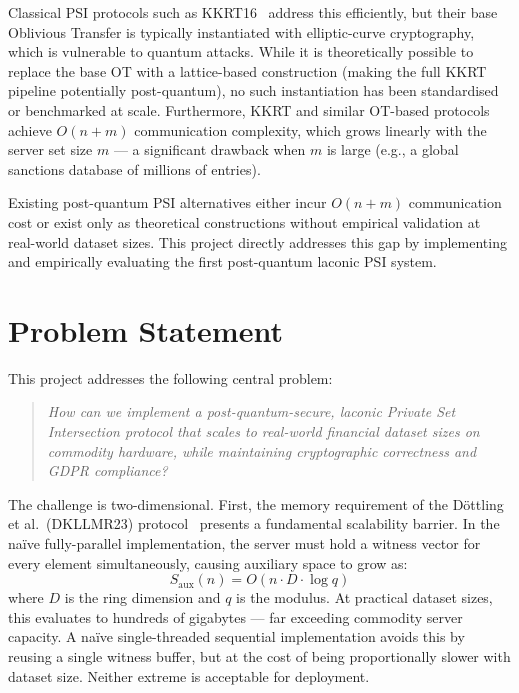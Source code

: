 Classical PSI protocols such as KKRT16~\cite{kolesnikov2016efficient} address this
efficiently, but their base Oblivious Transfer is typically instantiated with
elliptic-curve cryptography, which is vulnerable to quantum attacks. While it is
theoretically possible to replace the base OT with a lattice-based construction
(making the full KKRT pipeline potentially post-quantum), no such instantiation has
been standardised or benchmarked at scale. Furthermore, KKRT and similar OT-based
protocols achieve $O(n + m)$ communication complexity, which grows linearly with the
server set size $m$ --- a significant drawback when $m$ is large (e.g., a global
sanctions database of millions of entries).

Existing post-quantum PSI alternatives either incur $O(n + m)$ communication cost
or exist only as theoretical constructions without empirical validation at
real-world dataset sizes. This project directly addresses this gap by implementing
and empirically evaluating the first post-quantum laconic PSI system.

\section{Problem Statement}

This project addresses the following central problem:
\begin{quote}
    \textit{How can we implement a post-quantum-secure, laconic Private Set Intersection
    protocol that scales to real-world financial dataset sizes on commodity hardware,
    while maintaining cryptographic correctness and GDPR compliance?}
\end{quote}

The challenge is two-dimensional. First, the memory requirement of the D\"{o}ttling
et al.\ (DKLLMR23) protocol~\cite{dottling2023efficient} presents a fundamental
scalability barrier. In the na\"{i}ve fully-parallel implementation, the server must
hold a witness vector for every element simultaneously, causing auxiliary space to
grow as:
\[
    S_{\text{aux}}(n) = O(n \cdot D \cdot \log q)
\]
where $D$ is the ring dimension and $q$ is the modulus. At practical dataset sizes,
this evaluates to hundreds of gigabytes --- far exceeding commodity server capacity.
A na\"{i}ve single-threaded sequential implementation avoids this by reusing a single
witness buffer, but at the cost of being proportionally slower with dataset size.
Neither extreme is acceptable for deployment.

